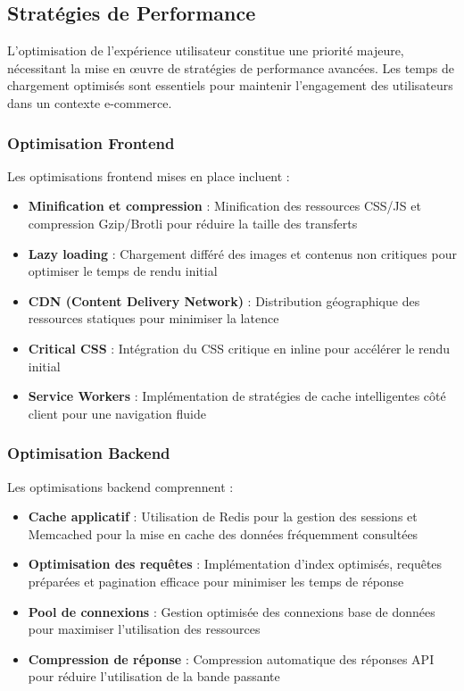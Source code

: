 \documentclass[12pt,a4paper]{report}
\begin{document}
\subsection{Stratégies de Performance}
L'optimisation de l'expérience utilisateur constitue une priorité majeure, nécessitant la mise en œuvre de stratégies de performance avancées. Les temps de chargement optimisés sont essentiels pour maintenir l'engagement des utilisateurs dans un contexte e-commerce.

\subsubsection{Optimisation Frontend}
Les optimisations frontend mises en place incluent :
\begin{itemize}
    \item \textbf{Minification et compression} : Minification des ressources CSS/JS et compression Gzip/Brotli pour réduire la taille des transferts
    \item \textbf{Lazy loading} : Chargement différé des images et contenus non critiques pour optimiser le temps de rendu initial
    \item \textbf{CDN (Content Delivery Network)} : Distribution géographique des ressources statiques pour minimiser la latence
    \item \textbf{Critical CSS} : Intégration du CSS critique en inline pour accélérer le rendu initial
    \item \textbf{Service Workers} : Implémentation de stratégies de cache intelligentes côté client pour une navigation fluide
\end{itemize}

\subsubsection{Optimisation Backend}
Les optimisations backend comprennent :
\begin{itemize}
    \item \textbf{Cache applicatif} : Utilisation de Redis pour la gestion des sessions et Memcached pour la mise en cache des données fréquemment consultées
    \item \textbf{Optimisation des requêtes} : Implémentation d'index optimisés, requêtes préparées et pagination efficace pour minimiser les temps de réponse
    \item \textbf{Pool de connexions} : Gestion optimisée des connexions base de données pour maximiser l'utilisation des ressources
    \item \textbf{Compression de réponse} : Compression automatique des réponses API pour réduire l'utilisation de la bande passante
\end{itemize}
\end{document}
